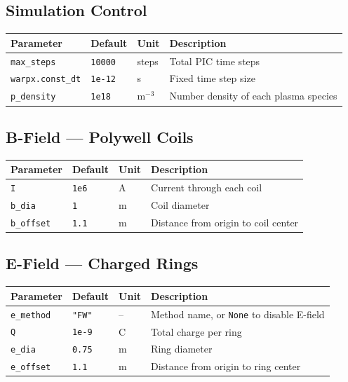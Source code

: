 \documentclass[11pt, a4paper]{article}
\begin{document}
\subsection{Simulation Control}
\begin{longtable}{L{3.5cm} L{2cm} L{1.5cm} L{6.5cm}}
\toprule
\textbf{Parameter} & \textbf{Default} & \textbf{Unit} & \textbf{Description} \\
\midrule
\texttt{max\_steps} & \texttt{10000} & steps & Total PIC time steps \\
\texttt{warpx.const\_dt} & \texttt{1e-12} & s & Fixed time step size \\
\texttt{p\_density} & \texttt{1e18} & m$^{-3}$ & Number density of each plasma species \\
\bottomrule
\end{longtable}

\subsection{B-Field — Polywell Coils}
\begin{longtable}{L{3.5cm} L{2cm} L{1.5cm} L{6.5cm}}
\toprule
\textbf{Parameter} & \textbf{Default} & \textbf{Unit} & \textbf{Description} \\
\midrule
\texttt{I}        & \texttt{1e6} & A & Current through each coil \\
\texttt{b\_dia}   & \texttt{1}   & m & Coil diameter \\
\texttt{b\_offset}& \texttt{1.1} & m & Distance from origin to coil center \\
\bottomrule
\end{longtable}

\subsection{E-Field — Charged Rings}
\begin{longtable}{L{3.5cm} L{2cm} L{1.5cm} L{6.5cm}}
\toprule
\textbf{Parameter} & \textbf{Default} & \textbf{Unit} & \textbf{Description} \\
\midrule
\texttt{e\_method} & \texttt{"FW"} & -- & Method name, or \texttt{None} to disable E-field \\
\texttt{Q}         & \texttt{1e-9} & C  & Total charge per ring \\
\texttt{e\_dia}    & \texttt{0.75} & m  & Ring diameter \\
\texttt{e\_offset} & \texttt{1.1}  & m  & Distance from origin to ring center \\
\bottomrule
\end{longtable}
\end{document}
